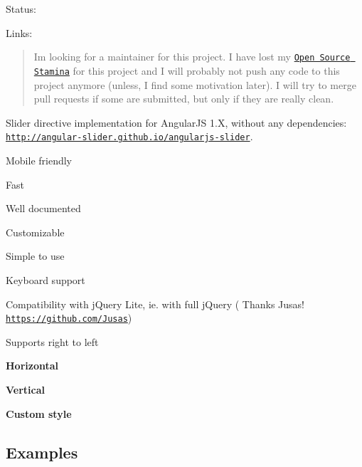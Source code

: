 Status\+:  \href{https://www.npmjs.com/package/angularjs-slider}{\tt } \href{http://npm-stat.com/charts.html?package=angularjs-slider&from=2015-01-01}{\tt } \href{https://travis-ci.org/angular-slider/angularjs-slider}{\tt } \href{https://codecov.io/github/angular-slider/angularjs-slider?branch=master}{\tt } 

Links\+: \href{https://gitter.im/rzajac/angularjs-slider?utm_source=badge&utm_medium=badge&utm_campaign=pr-badge&utm_content=badge}{\tt } \href{http://makeapullrequest.com}{\tt }

\begin{quote}
I\textquotesingle{}m looking for a maintainer for this project. I have lost my \href{https://medium.com/@kentcdodds/open-source-stamina-dafd063f9932#.sfay5wlzp}{\tt Open Source Stamina} for this project and I will probably not push any code to this project anymore (unless, I find some motivation later). I will try to merge pull requests if some are submitted, but only if they are really clean. \end{quote}


Slider directive implementation for Angular\+JS 1.\+X, without any dependencies\+: \href{http://angular-slider.github.io/angularjs-slider/index.html}{\tt http\+://angular-\/slider.\+github.\+io/angularjs-\/slider}.


\begin{DoxyItemize}
\item Mobile friendly
\item Fast
\item Well documented
\item Customizable
\item Simple to use
\item Keyboard support
\item Compatibility with j\+Query Lite, ie. with full j\+Query ( Thanks Jusas! \href{https://github.com/Jusas}{\tt https\+://github.\+com/\+Jusas})
\item Supports right to left
\end{DoxyItemize}

{\bfseries Horizontal}



{\bfseries Vertical}



{\bfseries Custom style} 

\subsection*{Examples}


